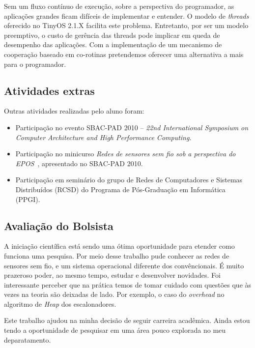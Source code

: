\documentclass[a4paper,onecolumn, 10pt]{article}
\begin{document}
Sem um fluxo contínuo de execução, sobre a perspectiva do programador, as aplicações grandes ficam difíceis de
implementar e entender. O modelo de \textit{threads} oferecido no 
TinyOS 2.1.X\cite{TEP134} facilita este problema. Entretanto, por ser um modelo preemptivo, o custo de
gerência das threads pode implicar em queda de desempenho das aplicações. 
Com a implementação de um mecanismo de cooperação baseado em co-rotinas pretendemos
oferecer uma alternativa a mais para o programador.


\subsection{Atividades extras}
Outras atividades realizadas pelo aluno foram:
\begin{itemize}
    \item Participação no evento SBAC-PAD 2010 -- 
{\em 22nd International Symposium on Computer Architecture and High Performance Computing}.
    \item Participação no minicurso 
{\em Redes de sensores sem fio sob a perspectiva do EPOS}~\cite{HoellerFrohlich/10}, 
apresentado no SBAC-PAD 2010.    
    \item Participação em seminário do grupo de Redes de Computadores e Sistemas Distribuídos (RCSD)
do Programa de Pós-Graduação em Informática (PPGI).
\end{itemize}

\subsection{Avaliação do Bolsista}
A iniciação científica está sendo uma ótima oportunidade para etender como funciona uma pesquisa. Por meio desse trabalho pude conhecer as redes de sensores sem fio, e um sistema operacional diferente dos convêncionais. É muito prazeroso poder, ao mesmo tempo, estudar e desenvolver novidades. Foi interessante perceber que na prática temos de tomar cuidado com questões que às vezes na teoria são deixadas de lado. Por exemplo, o caso do \textit{overhead} no algoritmo de \textit{Heap} dos escalonadores. 

Este trabalho ajudou na minha decisão de seguir carreira acadêmica. Ainda estou tendo a oportunidade de pesquisar em uma área pouco explorada no meu deparatamento.

%


\end{document}

